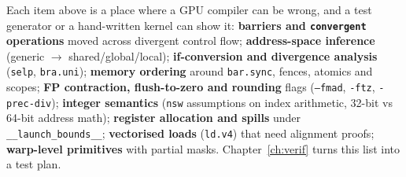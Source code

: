 \documentclass[10pt,a4paper,openany,oneside]{report}
\begin{document}
\begin{srcbox}
Each item above is a place where a GPU compiler can be wrong, and a test generator or a hand-written kernel can show it: \textbf{barriers and \texttt{convergent} operations} moved across divergent control flow; \textbf{address-space inference} (generic $\to$ shared/global/local); \textbf{if-conversion and divergence analysis} (\texttt{selp}, \texttt{bra.uni}); \textbf{memory ordering} around \texttt{bar.sync}, fences, atomics and scopes; \textbf{FP contraction, flush-to-zero and rounding} flags (\texttt{--fmad}, \texttt{-ftz}, \texttt{-prec-div}); \textbf{integer semantics} (\texttt{nsw} assumptions on index arithmetic, 32-bit vs 64-bit address math); \textbf{register allocation and spills} under \texttt{\_\_launch\_bounds\_\_}; \textbf{vectorised loads} (\texttt{ld.v4}) that need alignment proofs; \textbf{warp-level primitives} with partial masks. Chapter~\ref{ch:verif} turns this list into a test plan.
\end{srcbox}
\end{document}
